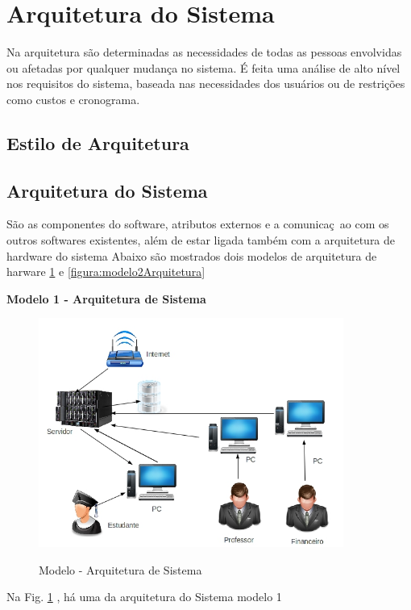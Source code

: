  
\section{Arquitetura do Sistema}
Na arquitetura são determinadas as necessidades de todas as pessoas envolvidas ou afetadas por qualquer mudança no sistema. É feita uma análise de alto nível nos requisitos do sistema, baseada nas necessidades dos usuários ou de restrições como custos e cronograma.

\subsection{Estilo de Arquitetura}
  \subsection{Arquitetura do Sistema}
  
 
  São as componentes do software, atributos externos e a comunicaç~ao com os outros softwares existentes, além de estar ligada também com a 
  arquitetura de hardware do sistema
  Abaixo são mostrados dois modelos de arquitetura de harware \ref{figura:ArquiteturaDeSoftware} e \ref{figura:modelo2Arquitetura}
  
   \textbf{Modelo 1 - Arquitetura de Sistema }
  
       \begin{figure}[H]
                 \caption{Modelo - Arquitetura de Sistema}
               \centering %
                \includegraphics[width=10cm]{analisedeProjeto/ArquiteturaDeSoftware} %
                \label{figura:ArquiteturaDeSoftware}
                \end{figure}
                Na Fig. \ref{figura:ArquiteturaDeSoftware} , há uma da arquitetura do Sistema modelo 1
                

